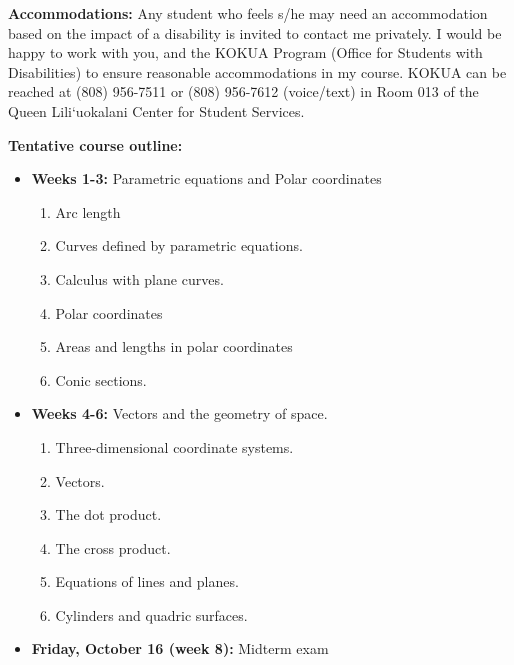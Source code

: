 \documentclass[10pt]{article}
\newcommand{\vt}{\vskip 5mm} %
\newcommand{\Fl}{\vt\noindent\textbf} %
\begin{document}
\Fl{Accommodations:} Any student who feels s/he may need an accommodation
based on the impact of a disability is invited to contact me privately. I
would be happy to work with you, and the KOKUA Program (Office for Students
with Disabilities) to ensure reasonable accommodations in my course. KOKUA can
be reached at (808) 956-7511 or (808) 956-7612 (voice/text) in Room 013 of the
Queen Lili`uokalani Center for Student Services.

\Fl{Tentative course outline:}

\begin{itemize}
  \item \textbf{Weeks 1-3:} Parametric equations and Polar coordinates
  \begin{enumerate}
    \item Arc length
    \item Curves defined by parametric equations.
    \item Calculus with plane curves.
    \item Polar coordinates
    \item Areas and lengths in polar coordinates
    \item Conic sections.
  \end{enumerate}
  \item \textbf{Weeks 4-6:} Vectors and the geometry of space.
  \begin{enumerate}
    \item Three-dimensional coordinate systems.
    \item Vectors.
    \item The dot product.
    \item The cross product.
    \item Equations of lines and planes.
    \item Cylinders and quadric surfaces.
  \end{enumerate}
  \item \textbf{Friday, October 16 (week 8):} Midterm exam


\end{itemize}
\end{document}
